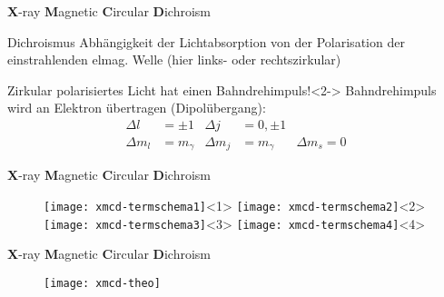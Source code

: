 \begin{frame}{\textbf{X}-ray \textbf{M}agnetic \textbf{C}ircular \textbf{D}ichroism}{}
 	\begin{block}{Dichroismus}
    	Abhängigkeit der Lichtabsorption von der Polarisation der einstrahlenden elmag. Welle (hier links- oder rechtszirkular) \\
    \end{block}

	\begin{block}{Zirkular polarisiertes Licht hat einen Bahndrehimpuls!}<2->
		Bahndrehimpuls wird an Elektron übertragen (Dipolübergang):
		\begin{align*}
			\Delta l&= \pm 1	&	\Delta j &= 0, \pm 1 \\
			\Delta m_l &= m_{\gamma}	&	\Delta m_j &= m_{\gamma}	& \Delta m_s=0
		\end{align*}
	\end{block}
\end{frame}


\begin{frame}{\textbf{X}-ray \textbf{M}agnetic \textbf{C}ircular \textbf{D}ichroism}{}
		\begin{figure}[H]
			\begin{center}
				\texttt{[image: xmcd-termschema1]}<1>
				\texttt{[image: xmcd-termschema2]}<2>
				\texttt{[image: xmcd-termschema3]}<3>
				\texttt{[image: xmcd-termschema4]}<4>
			\end{center}
		\end{figure}
\end{frame}

\begin{frame}{\textbf{X}-ray \textbf{M}agnetic \textbf{C}ircular \textbf{D}ichroism}{}
	\begin{figure}[H]
		\begin{center}
			\texttt{[image: xmcd-theo]}
		\end{center}
	\end{figure}
\end{frame}





